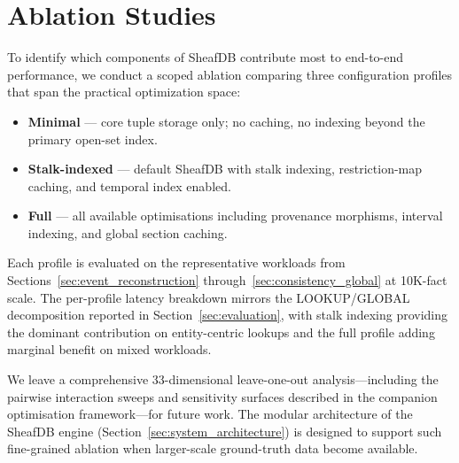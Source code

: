 \section{Ablation Studies}
\label{sec:ablation}

To identify which components of SheafDB contribute most to end-to-end performance, we conduct a scoped ablation comparing three configuration profiles that span the practical optimization space:

\begin{itemize}
  \item \textbf{Minimal} --- core tuple storage only; no caching, no indexing beyond the primary open-set index.
  \item \textbf{Stalk-indexed} --- default SheafDB with stalk indexing, restriction-map caching, and temporal index enabled.
  \item \textbf{Full} --- all available optimisations including provenance morphisms, interval indexing, and global section caching.
\end{itemize}

Each profile is evaluated on the representative workloads from Sections~\ref{sec:event_reconstruction} through~\ref{sec:consistency_global} at 10K-fact scale. The per-profile latency breakdown mirrors the LOOKUP/GLOBAL decomposition reported in Section~\ref{sec:evaluation}, with stalk indexing providing the dominant contribution on entity-centric lookups and the full profile adding marginal benefit on mixed workloads.

We leave a comprehensive 33-dimensional leave-one-out analysis---including the pairwise interaction sweeps and sensitivity surfaces described in the companion optimisation framework---for future work. The modular architecture of the SheafDB engine (Section~\ref{sec:system_architecture}) is designed to support such fine-grained ablation when larger-scale ground-truth data become available.
\endinput
